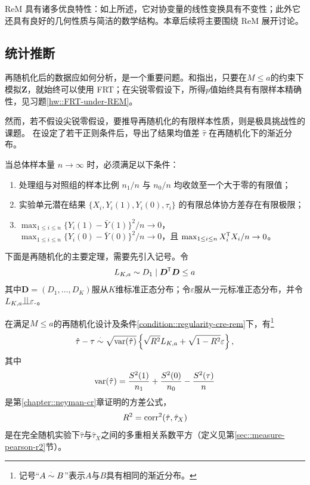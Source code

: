  

ReM 具有诸多优良特性：如上所述，它对协变量的线性变换具有不变性；此外它还具有良好的几何性质与简洁的数学结构。本章后续将主要围绕 ReM 展开讨论。  


\subsection{统计推断}

再随机化后的数据应如何分析，是一个重要问题。\citet{bruhn2009pursuit}和\citet{morgan2012rerandomization}指出，只要在$M\leq a$的约束下模拟$\bm{Z}$，就始终可以使用 FRT；在尖锐零假设下，所得$p$值始终具有有限样本精确性，见习题\ref{hw::FRT-under-REM}。 


然而，若不假设尖锐零假设，要推导再随机化的有限样本性质，则是极具挑战性的课题。\citet{li2018asymptotic} 在设定了若干正则条件后，导出了结果均值差 $\hat{\tau}$ 在再随机化下的渐近分布。



\begin{condition}\label{condition::regularity-cre-rem}
当总体样本量 $n\rightarrow \infty$ 时，必须满足以下条件：
\begin{enumerate}
\item 
处理组与对照组的样本比例 $n_1/n$ 与 $n_0/n$ 均收敛至一个大于零的有限值；
\item 
实验单元潜在结果 $\{  X_i, Y_i(1), Y_i(0), \tau_i \}$ 的有限总体协方差存在有限极限；
\item
$\max_{1\leq i \leq n}  \{   Y_i(1) - \bar{Y}(1) \} ^2/n \rightarrow 0 $， $\max_{1\leq i \leq n}  \{   Y_i(0) - \bar{Y}(0) \}^2/n \rightarrow 0 $，且 $\max_{1\leq i \leq n}   X_i ^{\mkern-1.5mu\mathsf{T}} X_i/n \rightarrow 0 $。
\end{enumerate}
\end{condition} 


下面是再随机化的主要定理，需要先引入记号。令
$$
L_{K,a} \sim D_1\mid \bm{D}^{\mkern-1.5mu\mathsf{T}} \bm{D} \leq a
$$
其中$\bm{D} = (D_1,\ldots, D_K)$服从$K$维标准正态分布；令$ \varepsilon$服从一元标准正态分布，并令$L_{K,a}  \ind \varepsilon .$。


\begin{theorem}\label{thm::remasymptotics}
在满足$M\leq a$的再随机化设计及条件\ref{condition::regularity-cre-rem}下，有\footnote{记号“$A \stackrel{\cdot}{\sim} B$”表示$A$与$B$具有相同的渐近分布。}
$$
\hat{\tau} - \tau \stackrel{\cdot}{\sim} \sqrt{ \textup{var}(\hat \tau) }  \left\{   \sqrt{R^2} L_{K,a}  + \sqrt{1-R^2} \varepsilon \right\},
$$
其中
$$
\textup{var}( \hat{\tau} ) = \frac{S^2(1)}{n_1} + \frac{S^2(0)}{n_0} - \frac{S^2(\tau)}{n}
$$
是第\ref{chapter::neyman-cr}章证明的\citet{Neyman:1923}方差公式，
$$
R^2 = \textup{corr}^2(\hat{\tau}, \hat{\tau}_X   )
$$
是在完全随机实验下$\hat{\tau}$与$\hat{\tau}_X $之间的多重相关系数平方（定义见第\ref{sec::measure-pearson-r2}节）。
\end{theorem}


